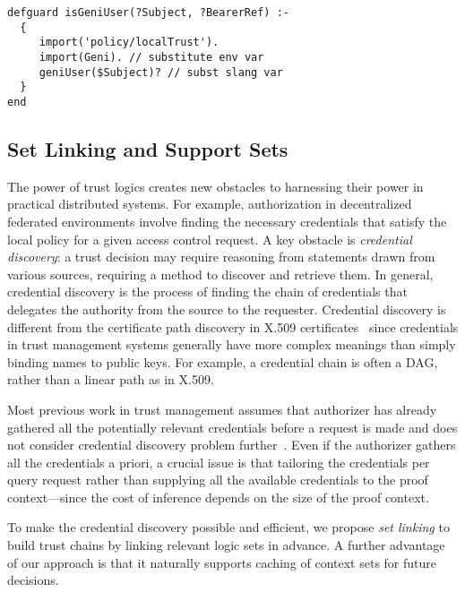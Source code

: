 {\begin{lstlisting}
defguard isGeniUser(?Subject, ?BearerRef) :- 
  {
     import('policy/localTrust').
     import(Geni). // substitute env var
     geniUser($Subject)? // subst slang var
  }
end
\end{lstlisting}

\subsection{Set Linking and Support Sets}
\label{sec:linking}

The power of trust logics creates new obstacles to harnessing their power in
practical distributed systems. For example, authorization in decentralized
federated environments involve finding the necessary credentials that satisfy
the local policy for a given access control request. A key obstacle is {\it
credential discovery}: a trust decision may require reasoning from statements
drawn from various sources, requiring a method to discover and retrieve them.
In general, credential discovery is the process of finding the chain of
credentials that delegates the authority from the source to the requester.
Credential discovery is different from the certificate path discovery in X.509
certificates~\cite{Elley01:cert-path-disc} since credentials in trust
management systems generally have more complex meanings than simply binding
names to public keys. For example, a credential chain is often a DAG, rather
than a linear path as in X.509.

Most previous work in trust management assumes that authorizer has already
gathered all the potentially relevant credentials before a request is made and
does not consider credential discovery problem
further~\cite{blaze96:trust, blaze03:keynote, Becker10:secpal}.
Even if the authorizer gathers all the credentials a priori, a crucial issue is
that tailoring the credentials per query request rather than supplying all the
available credentials to the proof context---since the cost of inference
depends on the size of the proof context.

To make the credential discovery possible and efficient, we propose {\it set
linking} to build trust chains by linking relevant logic sets in advance.  A
further advantage of our approach is that it naturally supports caching of
context sets for future decisions.

}
